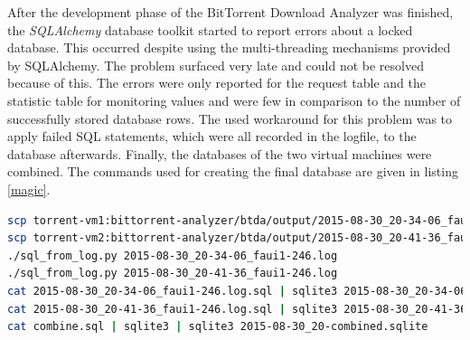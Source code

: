 \documentclass[10pt, a4paper, twoside=false, headsepline]{scrbook}
\renewcommand{\_}{\origunderscore\allowbreak}
\begin{document}
After the development phase of the BitTorrent Download Analyzer was finished, the \emph{SQLAlchemy} database toolkit started to report errors about a locked database. This occurred despite using the multi-threading mechanisms provided by SQLAlchemy. The problem surfaced very late and could not be resolved because of this. The errors were only reported for the request table and the statistic table for monitoring values and were few in comparison to the number of successfully stored database rows. The used workaround for this problem was to apply failed SQL statements, which were all recorded in the logfile, to the database afterwards. Finally, the databases of the two virtual machines were combined. The commands used for creating the final database are given in listing \ref{magic}.
\begin{lstlisting}[language=bash, otherkeywords={scp, sqlite3}, float, caption={[Creating the final database]Steps to create the final database. The \texttt{combine.sql} scripts produces \texttt{INSERT} statments for all table rows of both databases and handles torrent IDs appropriately. Filename timestamps are in CEST, which is UTC+02:00. \texttt{2015-08-30\_20-combined.sqlite} holds the data used for the evaluation.}, captionpos=b, label=magic]
scp torrent-vm1:bittorrent-analyzer/btda/output/2015-08-30_20-34-06_faui1-246* .
scp torrent-vm2:bittorrent-analyzer/btda/output/2015-08-30_20-41-36_faui1-246* .
./sql_from_log.py 2015-08-30_20-34-06_faui1-246.log
./sql_from_log.py 2015-08-30_20-41-36_faui1-246.log
cat 2015-08-30_20-34-06_faui1-246.log.sql | sqlite3 2015-08-30_20-34-06_faui1-246.sqlite
cat 2015-08-30_20-41-36_faui1-246.log.sql | sqlite3 2015-08-30_20-41-36_faui1-246.sqlite
cat combine.sql | sqlite3 | sqlite3 2015-08-30_20-combined.sqlite
\end{lstlisting}
\end{document}
